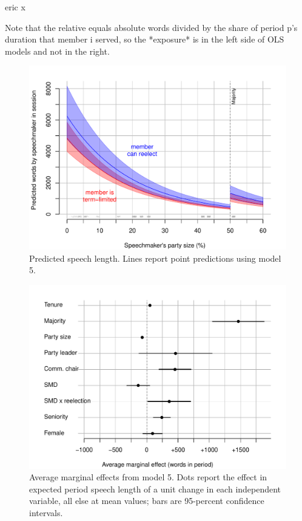 \documentclass[letter,12pt]{article}
\begin{document}
eric  x

Note that the relative equals absolute words divided by the share of period p's duration that member i served, so the *exposure* is in the left side of OLS models and not in the right. 





\begin{figure}
  \centering
    \includegraphics[width=.67\columnwidth]{../plots/predictedWords.pdf}
    \caption{Predicted speech length. Lines report point predictions using model 5.}\label{F:predict}
\end{figure}




\begin{figure}
  \centering
    \includegraphics[width=.67\columnwidth]{../plots/avgMgEffects.pdf}
    \caption{Average marginal effects from model 5. Dots report the effect in expected period speech length of a unit change in each independent variable, all else at mean values; bars are 95-percent confidence intervals.}\label{F:avgmgeff}
\end{figure}
\end{document}
